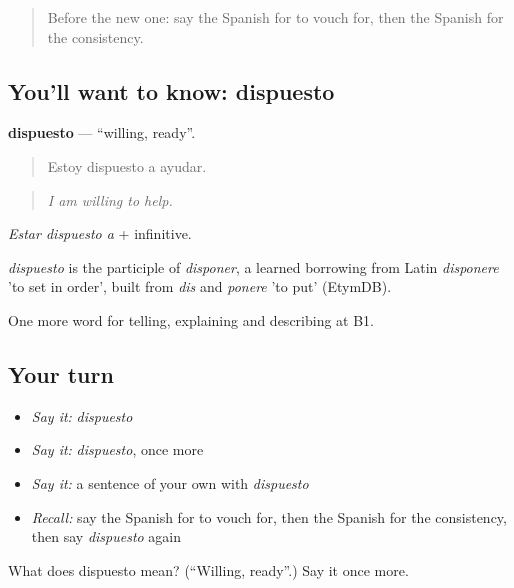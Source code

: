 \label{lesson:ES-C635-dispuesto}



\begin{quote}
Before the new one: say the Spanish for to vouch for, then the Spanish for the consistency.
\end{quote}

\subsection*{You'll want to know: dispuesto}
\textbf{dispuesto} — \textquotedblleft{}willing, ready\textquotedblright{}.

\begin{quote}
Estoy dispuesto a ayudar.
\end{quote}

\begin{quote}
\emph{I am willing to help.}
\end{quote}

\emph{Estar dispuesto a} + infinitive.

\begin{cousinweb}
\emph{dispuesto} is the participle of \emph{disponer}, a learned borrowing from Latin \emph{disponere} 'to set in order', built from \emph{dis} and \emph{ponere} 'to put' (EtymDB).
\end{cousinweb}

\begin{grammarlens}[title={What you've built}]
One more word for telling, explaining and describing at B1.
\end{grammarlens}

\subsection*{Your turn}
\begin{itemize}
\raggedright
  \item \emph{Say it:} \emph{dispuesto}
  \item \emph{Say it:} \emph{dispuesto}, once more
  \item \emph{Say it:} a sentence of your own with \emph{dispuesto}
  \item \emph{Recall:} say the Spanish for to vouch for, then the Spanish for the consistency, then say \emph{dispuesto} again
\end{itemize}

\begin{tcolorbox}[breakable,colback=teal!4,colframe=teal!35!black,title={Before you move on}]
What does dispuesto mean? (\textquotedblleft{}Willing, ready\textquotedblright{}.) Say it once more.
\end{tcolorbox}
